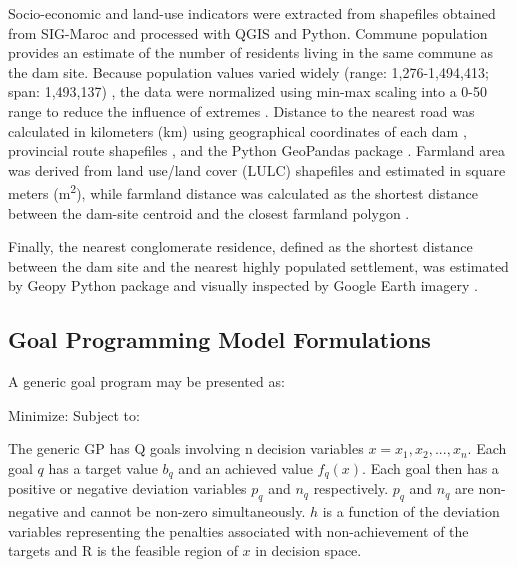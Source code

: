 Socio-economic and land-use indicators were extracted from shapefiles obtained from SIG-Maroc \cite{SIG_Maroc_Shapefiles} and processed with QGIS and Python. Commune population provides an estimate of the number of residents living in the same commune as the dam site. Because population values varied widely (range: 1,276-1,494,413; span: 1,493,137) \cite{Ersoy2022}, the data were normalized using min-max scaling into a 0-50 range to reduce the influence of extremes \cite{Kosareva2018,population_normalization_py}. Distance to the nearest road was calculated in kilometers (km) using geographical coordinates of each dam \cite{Coordinates2025}, provincial route shapefiles \cite{routes2025}, and the Python GeoPandas package \cite{roadsCode2025}. Farmland area was derived from land use/land cover (LULC) shapefiles \cite{LULC_MegaArchive} and estimated in square meters (m\textsuperscript{2}), while farmland distance was calculated as the shortest distance between the dam-site centroid and the closest farmland polygon \cite{farmlandAreaCode2025}.

Finally, the nearest conglomerate residence, defined as the shortest distance between the dam site and the nearest highly populated settlement, was estimated by Geopy Python package \cite{congloResidence2025} and visually inspected by Google Earth imagery \cite{congolerateResidenceGearth2025}.



\subsection{Goal Programming Model Formulations}

A generic goal program \cite{jones2010} may be presented as:

Minimize:
            \EqGGPMinFunctionOne
Subject to:
            \EqGGPMinFunctionSubTwo
            \EqGGPMinFunctionSubThree
            \EqGGPMinFunctionSubFour    

The generic GP has Q goals involving n decision variables $x = x_1,x_2, ...,x_n.$ Each goal $q$ has a target value $b_q$ and an achieved value $f_q(x)$. Each goal then has a positive or negative deviation variables $p_q$ and $n_q$ respectively. $p_q$ and $n_q$ are non-negative and cannot be non-zero simultaneously. $h$ is a function of the deviation variables representing the penalties associated with non-achievement of the targets and R is the feasible region of $x$ in decision space.

